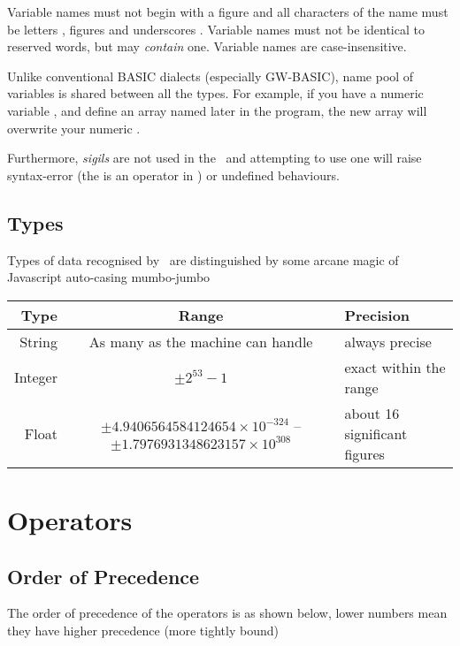 Variable names must not begin with a figure and all characters of the name must be letters , figures  and underscores \code{\_}. Variable names must not be identical to reserved words, but may \emph{contain} one. Variable names are case-insensitive.

Unlike conventional BASIC dialects (especially GW-BASIC), name pool of variables is shared between all the types. For example, if you have a numeric variable , and define an array named  later in the program, the new array will overwrite your numeric .

Furthermore, \emph{sigils} are not used in the \tbas\ and attempting to use one will raise syntax-error (the \code{\$} is an operator in \tbas) or undefined behaviours.

\subsection{Types}

Types of data recognised by \tbas\ are distinguished by some arcane magic of Javascript auto-casing mumbo-jumbo

\begin{tabulary}{\textwidth}{rCL}
Type & Range & Precision \\
\hline
String & As many as the machine can handle & always precise \\
Integer & $ \pm 2^{53}-1 $ & exact within the range \\
Float & $ \pm 4.9406564584124654 \times 10^{-324} $ -- $ \pm 1.7976931348623157 \times 10^{308} $ & about 16 significant figures \\
\end{tabulary}

\section{Operators}
\subsection{Order of Precedence}

The order of precedence of the operators is as shown below, lower numbers mean they have higher precedence (more tightly bound)


